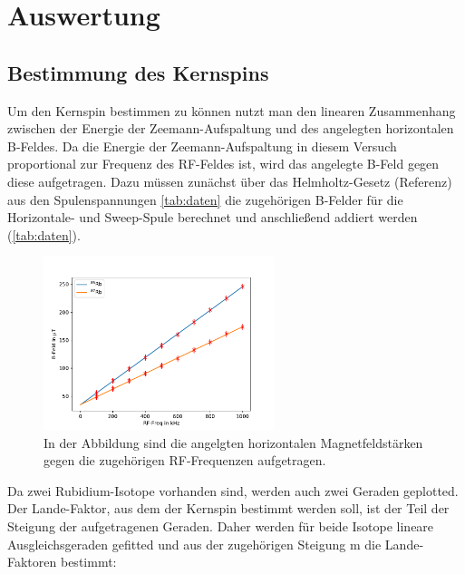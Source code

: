 \newpage
\section{Auswertung}
    \subsection{Bestimmung des Kernspins}
        Um den Kernspin bestimmen zu können nutzt man den linearen Zusammenhang zwischen der Energie der Zeemann-Aufspaltung und des angelegten horizontalen B-Feldes. Da die Energie der Zeemann-Aufspaltung 
        in diesem Versuch proportional zur Frequenz des RF-Feldes ist, wird das angelegte B-Feld gegen diese aufgetragen. Dazu müssen zunächst über das Helmholtz-Gesetz (Referenz) aus den Spulenspannungen 
        \ref{tab:daten} die zugehörigen B-Felder für die Horizontale- und Sweep-Spule berechnet und anschließend addiert werden (\ref{tab:daten}).  
        
        
        \FloatBarrier

        \begin{figure}[h]
          \centering
          \includegraphics[width = 0.6\textwidth]{pictures/Rb_85_87.pdf}
          \caption{In der Abbildung sind die angelgten horizontalen Magnetfeldstärken gegen die zugehörigen RF-Frequenzen aufgetragen. }
          \label{fig:B_gegen_RF}
        \end{figure}

        \FloatBarrier

        \noindent
        
        
        
        Da zwei Rubidium-Isotope vorhanden sind, werden auch zwei Geraden geplotted. Der Lande-Faktor, aus dem der Kernspin bestimmt werden soll, ist der Teil der Steigung der aufgetragenen Geraden. Daher 
        werden für beide Isotope lineare Ausgleichsgeraden gefitted und aus der zugehörigen Steigung m die Lande-Faktoren bestimmt:

